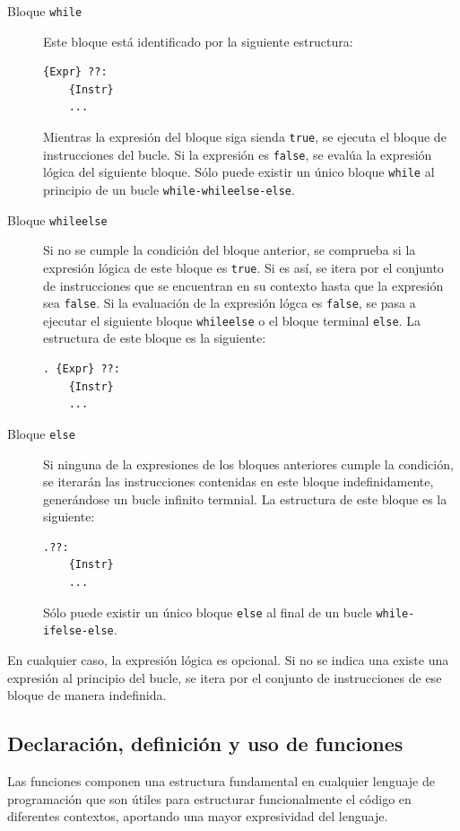 \documentclass[11pt, english]{article}
\begin{document}
\begin{description}
	\item[Bloque \texttt{while}] Este bloque está identificado por la siguiente estructura:
	\begin{center}
\begin{lstlisting}
{Expr} ??:
	{Instr}
	...
\end{lstlisting}
	\end{center}
	Mientras la expresión del bloque siga sienda \texttt{true}, se ejecuta el bloque de instrucciones del bucle. Si la expresión es \texttt{false}, se evalúa la expresión lógica del siguiente bloque. Sólo puede existir un único bloque \texttt{while} al principio de un bucle \texttt{while-whileelse-else}.
	\item[Bloque \texttt{whileelse}] Si no se cumple la condición del bloque anterior, se comprueba si la expresión lógica de este bloque es \texttt{true}. Si es así, se itera por el conjunto de instrucciones que se encuentran en su contexto hasta que la expresión sea \texttt{false}. Si la evaluación de la expresión lógca es \texttt{false}, se pasa a ejecutar el siguiente bloque \texttt{whileelse} o el bloque terminal \texttt{else}. La estructura de este bloque es la siguiente:
	\begin{center}
\begin{lstlisting}
. {Expr} ??:
	{Instr}
	...
\end{lstlisting}
	\end{center}
	\item[Bloque \texttt{else}] Si ninguna de la expresiones de los bloques anteriores cumple la condición, se iterarán las instrucciones contenidas en este bloque indefinidamente, generándose un bucle infinito termnial. La estructura de este bloque es la siguiente:
	\begin{center}
\begin{lstlisting}
.??:
	{Instr}
	...
\end{lstlisting}
	\end{center}
	Sólo puede existir un único bloque \texttt{else} al final de un bucle \texttt{while-ifelse-else}.
\end{description}

En cualquier caso, la expresión lógica es opcional. Si no se indica una existe una expresión al principio del bucle, se itera por el conjunto de instrucciones de ese bloque de manera indefinida.


\subsection{Declaración, definición y uso de funciones}\label{functions}
Las funciones componen una estructura fundamental en cualquier lenguaje de programación que son útiles para estructurar funcionalmente el código en diferentes contextos, aportando una mayor expresividad del lenguaje.
\end{document}
